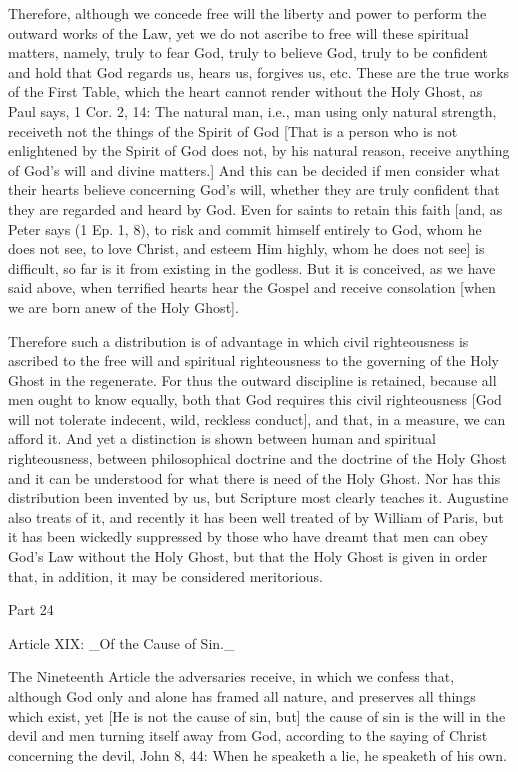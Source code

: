 Therefore, although we concede free will the liberty and power to
perform the outward works of the Law, yet we do not ascribe to free
will these spiritual matters, namely, truly to fear God, truly to
believe God, truly to be confident and hold that God regards us,
hears us, forgives us, etc. These are the true works of the First
Table, which the heart cannot render without the Holy Ghost, as Paul
says, 1 Cor. 2, 14: The natural man, i.e., man using only natural
strength, receiveth not the things of the Spirit of God [That is a
person who is not enlightened by the Spirit of God does not, by his
natural reason, receive anything of God's will and divine matters.]
And this can be decided if men consider what their hearts believe
concerning God's will, whether they are truly confident that they are
regarded and heard by God.  Even for saints to retain this faith [and,
as Peter says (1 Ep. 1, 8), to risk and commit himself entirely to
God, whom he does not see, to love Christ, and esteem Him highly,
whom he does not see] is difficult, so far is it from existing in the
godless.  But it is conceived, as we have said above, when terrified
hearts hear the Gospel and receive consolation [when we are born anew
of the Holy Ghost].

Therefore such a distribution is of advantage in which civil
righteousness is ascribed to the free will and spiritual
righteousness to the governing of the Holy Ghost in the regenerate.
For thus the outward discipline is retained, because all men ought to
know equally, both that God requires this civil righteousness [God
will not tolerate indecent, wild, reckless conduct], and that, in a
measure, we can afford it.  And yet a distinction is shown between
human and spiritual righteousness, between philosophical doctrine and
the doctrine of the Holy Ghost and it can be understood for what
there is need of the Holy Ghost.  Nor has this distribution been
invented by us, but Scripture most clearly teaches it.  Augustine
also treats of it, and recently it has been well treated of by
William of Paris, but it has been wickedly suppressed by those who
have dreamt that men can obey God's Law without the Holy Ghost, but
that the Holy Ghost is given in order that, in addition, it may be
considered meritorious.




Part 24


Article XIX: _Of the Cause of Sin._

The Nineteenth Article the adversaries receive, in which we confess
that, although God only and alone has framed all nature, and
preserves all things which exist, yet [He is not the cause of sin,
but] the cause of sin is the will in the devil and men turning itself
away from God, according to the saying of Christ concerning the devil,
John 8, 44: When he speaketh a lie, he speaketh of his own.




